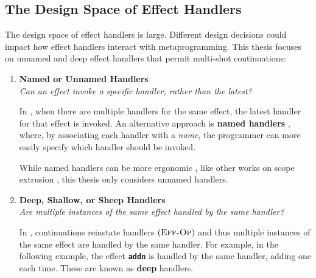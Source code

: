 \subsection{The Design Space of Effect Handlers}\label{subsection:effect-handler-design}
The design space of effect handlers is large. Different design decisions could impact how effect handlers interact with metaprogramming. This thesis focuses on unnamed and deep effect handlers that permit multi-shot continuations:

\renewcommand{\effconfiguration}[2]{{#1}; {#2}}
\renewcommand{\transition}[2]{#1 & \rightarrow & #2}
\newcommand{\rulename}[2]{(\textsc{{#1}-{#2}})}
\newcommand{\reductionRule}[1]{\rulename{Red}{#1}}
\newcommand{\congruenceRule}[1]{\rulename{Cng}{#1}}
\newcommand{\effectRule}[1]{\rulename{Eff}{#1}}

\begin{enumerate} 

 \item \textbf{\textsf{Named or Unnamed Handlers}}\\
        \textit{Can an effect invoke a specific handler, rather than the latest?}
        
        In \efflang{}, when there are multiple handlers for the same effect, the latest handler for that effect is invoked. An alternative approach is \textbf{named handlers} \citep{xie-2022}, where, by associating each handler with a \textit{name}, the programmer can more easily specify which handler should be invoked. 

        While named handlers can be more ergonomic \citep{xie-2022}, like other works on scope extrusion \citep{isoda-24}, this thesis only considers unnamed handlers.

  \item \textbf{\textsf{Deep, Shallow, or Sheep Handlers}}\\
         \textit{Are multiple instances of the same effect handled by the same handler?}

         In \efflang{}, continuations reinstate handlers $\effectRule{Op}$ and thus multiple instances of the same effect are handled by the same handler. For example, in the following example, the effect \textbf{\texttt{addn}} is handled by the same handler, adding one each time. These are known as \textbf{deep} handlers.
          

\end{enumerate}
